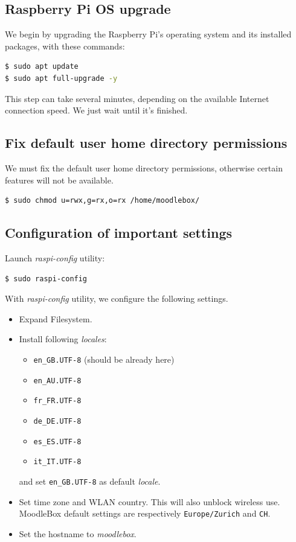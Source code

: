 \documentclass[12pt]{article}
\begin{document}
\subsection{Raspberry Pi OS upgrade}

We begin by upgrading the Raspberry Pi's operating system and its installed packages, with these commands:
\begin{lstlisting}[language=bash]
$ sudo apt update
$ sudo apt full-upgrade -y
\end{lstlisting}

This step can take several minutes, depending on the available Internet connection speed.
We just wait until it's finished.

\subsection{Fix default user home directory permissions}

We must fix the default user home directory permissions, otherwise certain features will not be available.

\begin{lstlisting}[language=bash]
$ sudo chmod u=rwx,g=rx,o=rx /home/moodlebox/
\end{lstlisting}

\subsection{Configuration of important settings}

Launch \emph{raspi-config} utility:
\begin{lstlisting}[language=bash]
$ sudo raspi-config
\end{lstlisting}

With \emph{raspi-config} utility, we configure the following settings.
\begin{itemize}
\item Expand Filesystem.
\item Install following \emph{locales}:
\begin{itemize}
\item \lstinline{en_GB.UTF-8} (should be already here)
\item \lstinline{en_AU.UTF-8}
\item \lstinline{fr_FR.UTF-8}
\item \lstinline{de_DE.UTF-8}
\item \lstinline{es_ES.UTF-8}
\item \lstinline{it_IT.UTF-8}
\end{itemize}
and set \lstinline{en_GB.UTF-8} as default \emph{locale}.
\item Set time zone and WLAN country.
This will also unblock wireless use.
MoodleBox default settings are respectively \lstinline{Europe/Zurich} and \lstinline{CH}.
\item Set the hostname to \emph{moodlebox}.
\end{itemize}
\end{document}
